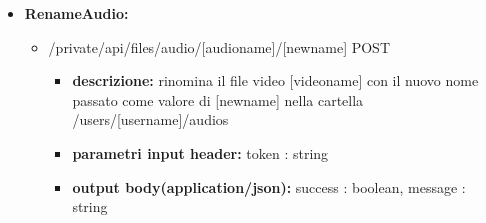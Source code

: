 {{\begin{itemize}
		\item \textbf{RenameAudio:}
			\begin{itemize}
			\item   /private/api/files/audio/[audioname]/[newname] POST
				\begin{itemize} 
				\item \textbf{descrizione:} rinomina il file video [videoname] con il nuovo nome passato come valore di [newname] nella cartella /users/[username]/audios
				\item \textbf{parametri input header:} token : string
				\item \textbf{output body(application/json):}  success : boolean, message : string
				\end{itemize}
			\end{itemize}
			
	\end{itemize}
	}
}
	
	
	
	
	
	
	
	
	
	
	
	
	
	
	